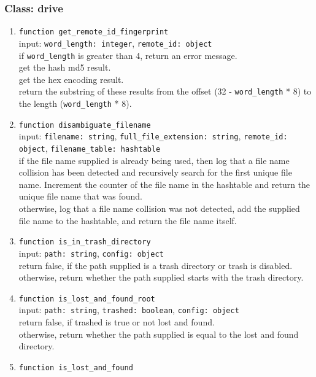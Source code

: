 \subsubsection{Class: drive}
\begin{enumerate}
    \item \verb|function get_remote_id_fingerprint| \\
    input: \verb|word_length: integer|, \verb|remote_id: object| \\
    if \verb|word_length| is greater than 4, return an error message. \\
    get the hash md5 result. \\
    get the hex encoding result. \\
    return the substring of these results from the offset (32 - \verb|word_length| * 8) to the length (\verb|word_length| * 8).
    \item \verb|function disambiguate_filename| \\
    input: \verb|filename: string|, \verb|full_file_extension: string|, \verb|remote_id: object|, \verb|filename_table: hashtable| \\
    if the file name supplied is already being used, then log that a file name collision has been detected and recursively search for the first unique file name. Increment the counter of the file name in the hashtable and return the unique file name that was found.\\
    otherwise, log that a file name collision was not detected, add the supplied file name to the hashtable, and return the file name itself.
    \item \verb|function is_in_trash_directory| \\
    input: \verb|path: string|, \verb|config: object| \\
    return false, if the path supplied is a trash directory or trash is disabled. \\
    otherwise, return whether the path supplied starts with the trash directory.
    \item \verb|function is_lost_and_found_root| \\
    input: \verb|path: string|, \verb|trashed: boolean|, \verb|config: object| \\
    return false, if trashed is true or not lost and found.\\
    otherwise, return whether the path supplied is equal to the lost and found directory.
    \item \verb|function is_lost_and_found| \\

\end{enumerate}
